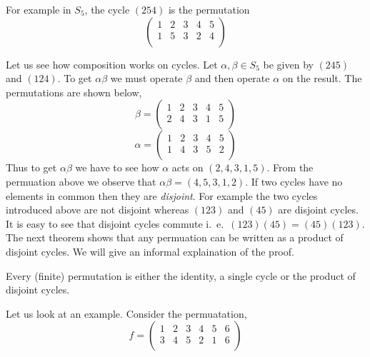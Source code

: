 For example in $S_5$, the cycle $\left(254\right)$ is the permutation
\begin{equation*}
 \begin{pmatrix}
  1 & 2 & 3 & 4 & 5  \\
  1 & 5 & 3 & 2 & 4  \\
 \end{pmatrix}
\end{equation*}

Let us see how composition works on cycles. Let $\alpha,\beta \in S_5$ be given by $(245)$ and $(124)$. To get
$\alpha\beta$ we must operate $\beta$ and then operate $\alpha$ on the result. The
permutations are shown below,
\begin{equation*}
    \beta = 
 \begin{pmatrix}
  1 & 2 & 3 & 4 & 5 \\
  2 & 4 & 3 & 1 & 5\\
 \end{pmatrix}
\end{equation*}
\begin{equation*}
    \alpha = 
 \begin{pmatrix}
  1 & 2 & 3 & 4 & 5 \\
  1 & 4 & 3 & 5 & 2\\
 \end{pmatrix}
\end{equation*}
Thus to get $\alpha\beta$ we have to see how $\alpha$ acts on $\left(2,4,3,1,5\right)$. From
the permuation above we observe that $\alpha\beta = \left(4,5,3,1,2\right)$.
If two cycles have no elements in common then they are \emph{disjoint}. For example the two cycles
introduced above are not disjoint whereas $(123)$ and $(45)$ are disjoint cycles. It is easy to see
that disjoint cycles commute i.~e.~$(123)(45) = (45)(123)$. The next theorem shows that any
permuation can be written as a product of disjoint cycles. We will give an informal explaination of
the proof.
\begin{Theorem}
    Every (finite) permutation is either the identity, a single cycle or the product of disjoint 
    cycles.
\end{Theorem}
Let us look at an example. Consider the permuatation,
\begin{equation*}
    f = 
 \begin{pmatrix}
  1 & 2 & 3 & 4 & 5 & 6 \\
  3 & 4 & 5 & 2 & 1 & 6 \\
 \end{pmatrix}
\end{equation*}
